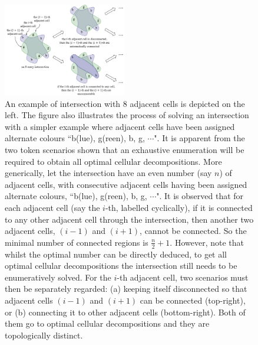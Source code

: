 \documentclass[journal]{IEEEtran}
\begin{document}
\begin{figure}[t]
\centering
\includegraphics[width = 0.48\textwidth]{figures/new_multi_entry_2}
\caption{
An example of intersection with $8$ adjacent cells is depicted on the left. 
The figure also illustrates the process of solving an intersection with a simpler example where adjacent cells have been assigned alternate colours ``b(lue), g(reen), b, g, $\cdots$". 
It is apparent from the two token scenarios shown that an exhaustive enumeration will be required to obtain all optimal cellular decompositions.
More generically, let the intersection have an even number (say $n$) of adjacent cells, with consecutive adjacent cells having been assigned alternate colours, ``b(lue), g(reen), b, g, $\cdots$". 
It is observed that for each adjacent cell (say the $i$-th, labelled cyclically), if it is connected to any other adjacent cell through the intersection, then another two adjacent cells, $(i-1)$ and $(i+1)$, cannot be connected. 
So the minimal number of connected regions is $\frac{n}{2}+1$. 
However, note that whilst the optimal number can be directly deduced, to get all optimal cellular decompositions the intersection still needs to be enumeratively solved. 
For the $i$-th adjacent cell, two scenarios must then be separately regarded: 
(a) keeping itself disconnected so that adjacent cells $(i-1)$ and $(i+1)$ can be connected (top-right), or (b) connecting it to other adjacent cells (bottom-right). 
Both of them go to optimal cellular decompositions and they are topologically distinct.
}\label{fig:multi_entry}
\end{figure}
\end{document}
